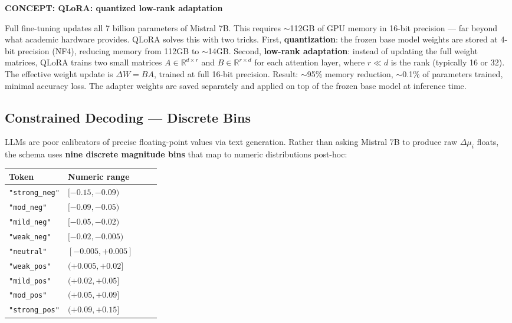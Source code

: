 \documentclass[11pt]{article}
\newcommand{\concept}[2]{%
  \begin{mdframed}[style=conceptbox]
  {\small\bfseries\color{bluefg}CONCEPT: #1}\par\smallskip #2
  \end{mdframed}}
\begin{document}
\concept{QLoRA: quantized low-rank adaptation}{
Full fine-tuning updates all 7 billion parameters of Mistral 7B. This requires
$\sim$112GB of GPU memory in 16-bit precision --- far beyond what academic hardware
provides. QLoRA solves this with two tricks. First, \textbf{quantization}: the
frozen base model weights are stored at 4-bit precision (NF4), reducing memory from
112GB to $\sim$14GB. Second, \textbf{low-rank adaptation}: instead of updating the
full weight matrices, QLoRA trains two small matrices $A \in \mathbb{R}^{d \times r}$
and $B \in \mathbb{R}^{r \times d}$ for each attention layer, where $r \ll d$ is the
rank (typically 16 or 32). The effective weight update is $\Delta W = BA$, trained
at full 16-bit precision. Result: $\sim$95\% memory reduction, $\sim$0.1\% of
parameters trained, minimal accuracy loss. The adapter weights are saved separately
and applied on top of the frozen base model at inference time.
}

\subsection*{Constrained Decoding --- Discrete Bins}

LLMs are poor calibrators of precise floating-point values via text generation.
Rather than asking Mistral 7B to produce raw $\Delta\mu_i$ floats, the schema uses
\textbf{nine discrete magnitude bins} that map to numeric distributions post-hoc:

\begin{center}
\begin{tabularx}{\linewidth}{p{0.30\linewidth}X}
\toprule
\textbf{Token} & \textbf{Numeric range} \\
\midrule
\texttt{"strong\_neg"} & $[-0.15, -0.09)$ \\
\texttt{"mod\_neg"}    & $[-0.09, -0.05)$ \\
\texttt{"mild\_neg"}   & $[-0.05, -0.02)$ \\
\texttt{"weak\_neg"}   & $[-0.02, -0.005)$ \\
\texttt{"neutral"}     & $[-0.005, +0.005]$ \\
\texttt{"weak\_pos"}   & $(+0.005, +0.02]$ \\
\texttt{"mild\_pos"}   & $(+0.02, +0.05]$ \\
\texttt{"mod\_pos"}    & $(+0.05, +0.09]$ \\
\texttt{"strong\_pos"} & $(+0.09, +0.15]$ \\
\bottomrule
\end{tabularx}
\end{center}
\end{document}
